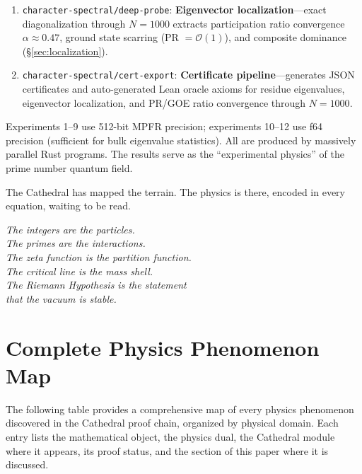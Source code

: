 \documentclass[11pt,a4paper]{article}
\begin{document}
\begin{enumerate}
{    universality}---tests residue class decomposition across
    $m \in \{3,5,7,8,12\}$ through $N = 1000$. Discovers the universal
    equation of state $N_c(m) \approx 60\,m/\varphi(m)$ and falsifies
    the Bott periodicity hypothesis (\S\ref{sec:universality}).
  \item \texttt{character-spectral/deep-probe}: \textbf{Eigenvector
    localization}---exact diagonalization through $N = 1000$ extracts
    participation ratio convergence $\alpha \approx 0.47$, ground state
    scarring (PR $= \mathcal{O}(1)$), and composite dominance
    (\S\ref{sec:localization}).
  \item \texttt{character-spectral/cert-export}: \textbf{Certificate
    pipeline}---generates JSON certificates and auto-generated Lean
    oracle axioms for residue eigenvalues, eigenvector localization,
    and PR/GOE ratio convergence through $N = 1000$.
\end{enumerate}
Experiments 1--9 use 512-bit MPFR precision; experiments 10--12 use
f64 precision (sufficient for bulk eigenvalue statistics). All are
produced by massively parallel Rust programs.
The results serve as the ``experimental physics'' of the prime number
quantum field.

The Cathedral has mapped the terrain. The physics is there,
encoded in every equation, waiting to be read.

\begin{flushright}
\emph{The integers are the particles.\\
The primes are the interactions.\\
The zeta function is the partition function.\\
The critical line is the mass shell.\\
The Riemann Hypothesis is the statement\\
that the vacuum is stable.}
\end{flushright}

\appendix
\section{Complete Physics Phenomenon Map}
\label{app:phenomenon-map}

The following table provides a comprehensive map of every physics phenomenon
discovered in the Cathedral proof chain, organized by physical domain.
Each entry lists the mathematical object, the physics dual, the Cathedral
module where it appears, its proof status, and the section of this paper
where it is discussed.
\end{document}
